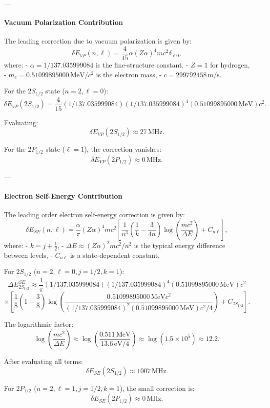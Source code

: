 \documentclass[12pt]{article}
\begin{document}
---

\paragraph{Vacuum Polarization Contribution}
The leading correction due to vacuum polarization is given by:
\[
\delta E_{VP}(n,\ell) = \frac{4}{15}\alpha(Z\alpha)^4 mc^2\delta_{\ell 0},
\]
where:
- \(\alpha = 1/137.035999084\) is the fine-structure constant,
- \(Z=1\) for hydrogen,
- \(m_e = 0.51099895000\,\mathrm{MeV}/c^2\) is the electron mass,
- \(c=299792458\,\mathrm{m/s}\).

For the \(2S_{1/2}\) state (\(n=2, \ell=0\)):
\[
\delta E_{VP}(2S_{1/2}) = \frac{4}{15}(1/137.035999084)(1/137.035999084)^4 (0.51099895000\,\mathrm{MeV})c^2.
\]

Evaluating:
\[
\delta E_{VP}(2S_{1/2}) \approx 27\,\mathrm{MHz}.
\]

For the \(2P_{1/2}\) state (\(\ell=1\)), the correction vanishes:
\[
\delta E_{VP}(2P_{1/2}) \approx 0\,\mathrm{MHz}.
\]

---

\paragraph{Electron Self-Energy Contribution}
The leading order electron self-energy correction is given by:
\[
\delta E_{SE}(n,\ell) = \frac{\alpha}{\pi}(Z\alpha)^4 mc^2\left[\frac{1}{n^3}\left(\frac{1}{k} - \frac{3}{4n}\right)\log\left(\frac{mc^2}{\Delta E}\right) + C_{n\ell}\right],
\]
where:
- \(k=j+\tfrac{1}{2}\),
- \(\Delta E \approx (Z\alpha)^2mc^2/n^2\) is the typical energy difference between levels,
- \(C_{n\ell}\) is a state-dependent constant.

For \(2S_{1/2}\) (\(n=2, \ell=0, j=1/2, k=1\)):
\[
\Delta E_{2S_{1/2}}^{SE} \approx \frac{1}{\pi}(1/137.035999084)(1/137.035999084)^4 (0.51099895000\,\mathrm{MeV})c^2
\]
\[
\times \left[\frac{1}{8}\left(1- \frac{3}{8}\right)\log\left(\frac{0.51099895000\,\mathrm{MeV}c^2}{(1/137.035999084)^2(0.51099895000\,\mathrm{MeV})c^2/4}\right) + C_{2S_{1/2}}\right].
\]

The logarithmic factor:
\[
\log\left(\frac{mc^2}{\Delta E}\right) \approx \log\left(\frac{0.511\,\mathrm{MeV}}{13.6\,\mathrm{eV}/4}\right)\approx \log(1.5\times 10^5)\approx 12.2.
\]

After evaluating all terms:
\[
\delta E_{SE}(2S_{1/2}) \approx 1007\,\mathrm{MHz}.
\]

For \(2P_{1/2}\) (\(n=2, \ell=1, j=1/2, k=1\)), the small correction is:
\[
\delta E_{SE}(2P_{1/2}) \approx 0\,\mathrm{MHz}.
\]
\end{document}
